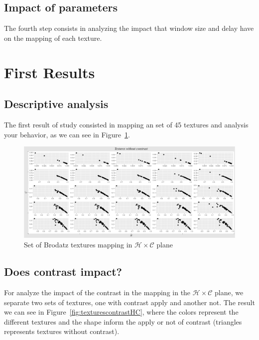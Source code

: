 \documentclass[12pt]{article}
\begin{document}
\subsection{Impact of parameters}

The fourth step consists in analyzing the impact that window size and delay have on the mapping of each texture.

\section{First Results}

\subsection{Descriptive analysis}

The first result of study consisted in mapping an set of 45 textures and analysis your behavior, as we can see in Figure~\ref{fig:textureshC}.

\begin{figure}[!h]
	\centering
	\includegraphics[scale = 0.42]{../../Images/Textures/Textures_no_contrast.png}        
	\caption{Set of Brodatz textures mapping in $\mathcal H\times \mathcal C$ plane}
	\label{fig:textureshC}
\end{figure}


\subsection{Does contrast impact?}

For analyze the impact of the contrast in the mapping in the $\mathcal H\times \mathcal C$ plane, we separate two sets of textures, one with contrast apply and another not. The result we can see in Figure~\ref{fig:texturescontrastHC}, where the colors represent the different textures and the shape inform the apply or not of contrast (triangles represents textures without contrast).
\end{document}
